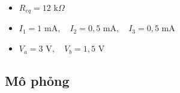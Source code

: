 \begin{dapsobox}
  \begin{itemize}[leftmargin=1.5em]
    \item $R_{eq} = 12\text{ k}\Omega$
    \item $I_1 = 1\text{ mA}, \quad I_2 = 0{,}5\text{ mA}, \quad I_3 = 0{,}5\text{ mA}$
    \item $V_a = 3\text{ V}, \quad V_b = 1{,}5\text{ V}$
  \end{itemize}
\end{dapsobox}

\subsection{Mô phỏng}
\simresult
{}
